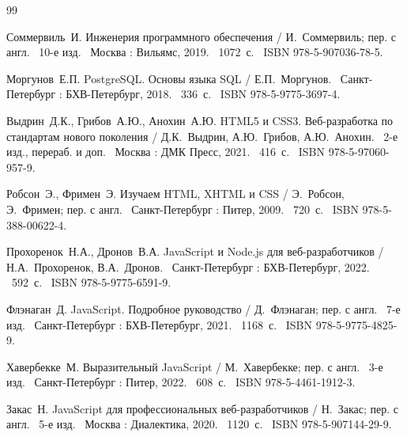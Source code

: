 \makeatletter
{}
\makeatother
\sloppy

\begin{thebibliography}{99}

    

	Соммервиль~И. Инженерия программного обеспечения / И.~Соммервиль; пер. с англ. \textemdash\ 10-е изд. \textemdash\ Москва : Вильямс, 2019. \textemdash\ 1072~с. \textemdash\ ISBN 978-5-907036-78-5.

	Моргунов~Е.П. PostgreSQL. Основы языка SQL / Е.П.~Моргунов. \textemdash\ Санкт-Петербург : БХВ-Петербург, 2018. \textemdash\ 336~с. \textemdash\ ISBN 978-5-9775-3697-4.

	Выдрин~Д.К., Грибов~А.Ю., Анохин~А.Ю. HTML5 и CSS3. Веб-разработка по стандартам нового поколения / Д.К.~Выдрин, А.Ю.~Грибов, А.Ю.~Анохин. \textemdash\ 2-е изд., перераб. и доп. \textemdash\ Москва : ДМК Пресс, 2021. \textemdash\ 416~с. \textemdash\ ISBN 978-5-97060-957-9.

	Робсон~Э., Фримен~Э. Изучаем HTML, XHTML и CSS / Э.~Робсон, Э.~Фримен; пер. с англ. \textemdash\ Санкт-Петербург : Питер, 2009. \textemdash\ 720~с. \textemdash\ ISBN 978-5-388-00622-4.

	Прохоренок~Н.А., Дронов~В.А. JavaScript и Node.js для веб-разработчиков / Н.А.~Прохоренок, В.А.~Дронов. \textemdash\ Санкт-Петербург : БХВ-Петербург, 2022. \textemdash\ 592~с. \textemdash\ ISBN 978-5-9775-6591-9.

	Флэнаган~Д. JavaScript. Подробное руководство / Д.~Флэнаган; пер. с англ. \textemdash\ 7-е изд. \textemdash\ Санкт-Петербург : БХВ-Петербург, 2021. \textemdash\ 1168~с. \textemdash\ ISBN 978-5-9775-4825-9.

	Хавербекке~М. Выразительный JavaScript / М.~Хавербекке; пер. с англ. \textemdash\ 3-е изд. \textemdash\ Санкт-Петербург : Питер, 2022. \textemdash\ 608~с. \textemdash\ ISBN 978-5-4461-1912-3.

	Закас~Н. JavaScript для профессиональных веб-разработчиков / Н.~Закас; пер. с англ. \textemdash\ 5-е изд. \textemdash\ Москва : Диалектика, 2020. \textemdash\ 1120~с. \textemdash\ ISBN 978-5-907144-29-9.


\end{thebibliography}
